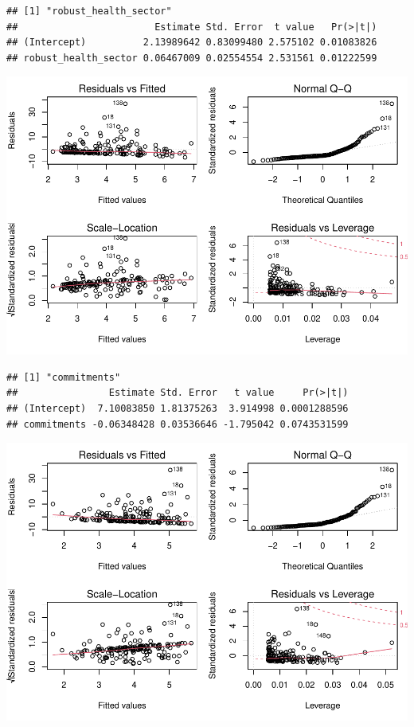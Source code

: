 \documentclass[
]{article}
\begin{document}
\begin{verbatim}
## [1] "robust_health_sector"
##                        Estimate Std. Error  t value   Pr(>|t|)
## (Intercept)          2.13989642 0.83099480 2.575102 0.01083826
## robust_health_sector 0.06467009 0.02554554 2.531561 0.01222599
\end{verbatim}

\includegraphics{Basic-Regression_files/figure-latex/unnamed-chunk-4-4.pdf}

\begin{verbatim}
## [1] "commitments"
##                Estimate Std. Error   t value     Pr(>|t|)
## (Intercept)  7.10083850 1.81375263  3.914998 0.0001288596
## commitments -0.06348428 0.03536646 -1.795042 0.0743531599
\end{verbatim}

\includegraphics{Basic-Regression_files/figure-latex/unnamed-chunk-4-5.pdf}
\end{document}
